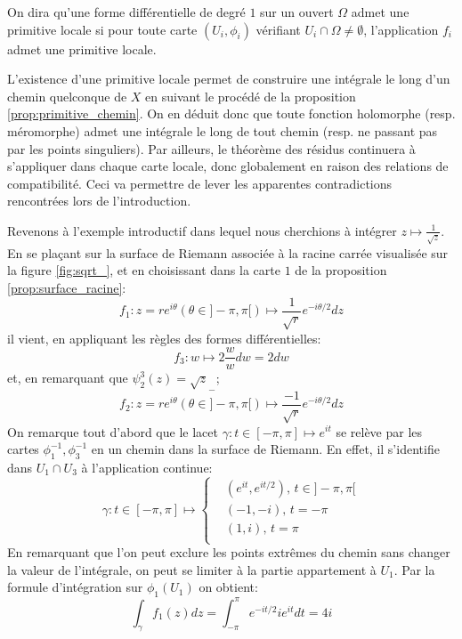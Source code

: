 \begin{defn}
On dira qu'une forme différentielle de degré $1$ sur un ouvert $\Omega$ admet une primitive locale si pour toute carte  $(U_i,\phi_i)$ vérifiant $U_i\cap \Omega \neq \emptyset$, l'application $f_i$ admet une primitive locale.
\end{defn}
L'existence d'une primitive locale permet de construire une intégrale le long d'un chemin quelconque de $X$ en suivant le procédé de la proposition \ref{prop:primitive_chemin}. On en déduit donc que toute fonction holomorphe (resp. méromorphe) admet une intégrale le long de tout chemin (resp. ne passant pas par les points singuliers). Par ailleurs, le théorème des résidus continuera à s'appliquer dans chaque carte locale, donc globalement en raison des relations de compatibilité. Ceci va permettre de lever les apparentes contradictions rencontrées lors de l'introduction. 

Revenons à l'exemple introductif dans lequel nous cherchions à intégrer $z \mapsto \frac{1}{\sqrt{z}}$. En se plaçant sur la surface de Riemann associée à la racine carrée visualisée sur la figure \ref{fig:sqrt_}, et en choisissant dans la carte $1$ de la proposition \ref{prop:surface_racine}:
\[
f_1 \colon z = r e^{i \theta} (\theta \in ]-\pi, \pi [)  \mapsto \frac{1}{\sqrt{r}}e^{-i \theta / 2} dz
\]
il vient, en appliquant les règles des formes différentielles:
\[
f_3 \colon w \mapsto 2 \frac{w}{w} dw = 2 dw
\]
et, en remarquant que $\psi_2^3(z)=\sqrt{z}_-$;
\[
f_2 \colon z = r e^{i \theta} (\theta \in ]-\pi, \pi [)  \mapsto \frac{-1}{\sqrt{r}}e^{-i \theta / 2} dz
\]
On remarque tout d'abord que le lacet $\gamma \colon t \in [-\pi,\pi] \mapsto e^{it}$ se relève par les cartes $\phi_1^{-1},\phi_3^{-1}$ en un chemin dans la surface de Riemann. En effet, il s'identifie dans $U_1\cap U_3$ à l'application continue:
\[
\gamma \colon t \in [-\pi,\pi] \mapsto
\begin{cases}
&\left(e^{it},e^{i t /2}\right), \, t \in ]-\pi,\pi[ \\
& \left(-1, -i \right), \, t = -\pi \\
& \left(1, i \right),  \, t = \pi \\
\end{cases}
\]
En remarquant que l'on peut exclure les points extrêmes du chemin sans changer la valeur de l'intégrale, on peut se limiter à la partie appartement à $U_1$. Par la formule d'intégration sur $\phi_1(U_1)$ on obtient:
\[
\int_\gamma f_1(z)dz = \int_{-\pi}^{\pi} e^{-it/2} i e^{it} dt = 4i
\]


